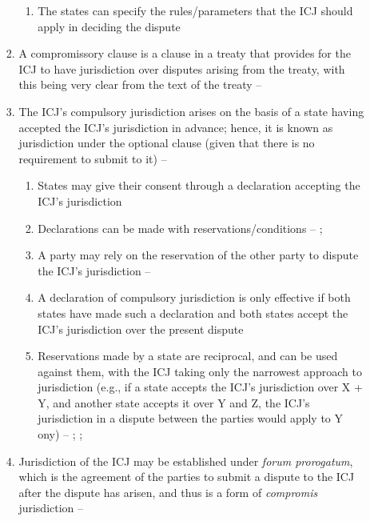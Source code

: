 \begin{enumerate}
\begin{enumerate}
\begin{enumerate}
\begin{enumerate}
                \item The states can specify the rules/parameters that the ICJ should apply in deciding the dispute
            \end{enumerate}
            \item A compromissory clause is a clause in a treaty that provides for the ICJ to have jurisdiction over disputes arising from the treaty, with this being very clear from the text of the treaty -- 
            \item The ICJ's compulsory jurisdiction arises on the basis of a state having accepted the ICJ's jurisdiction in advance; hence, it is known as jurisdiction under the optional clause (given that there is no requirement to submit to it) -- 
            \begin{enumerate}
                \item States may give their consent through a declaration accepting the ICJ's jurisdiction
                \item Declarations can be made with reservations/conditions -- ; 
                \item A party may rely on the reservation of the other party to dispute the ICJ's jurisdiction -- 
                \item A declaration of compulsory jurisdiction is only effective if both states have made such a declaration and both states accept the ICJ's jurisdiction over the present dispute
                \item Reservations made by a state are reciprocal, and can be used against them, with the ICJ taking only the narrowest approach to jurisdiction (e.g., if a state accepts the ICJ's jurisdiction over X + Y, and another state accepts it over Y and Z, the ICJ's jurisdiction in a dispute between the parties would apply to Y ony) -- ; ; 
            \end{enumerate}
            \item Jurisdiction of the ICJ may be established under \textit{forum prorogatum}, which is the agreement of the parties to submit a dispute to the ICJ after the dispute has arisen, and thus is a form of \textit{compromis} jurisdiction -- 

\end{enumerate}
\end{enumerate}
\end{enumerate}
